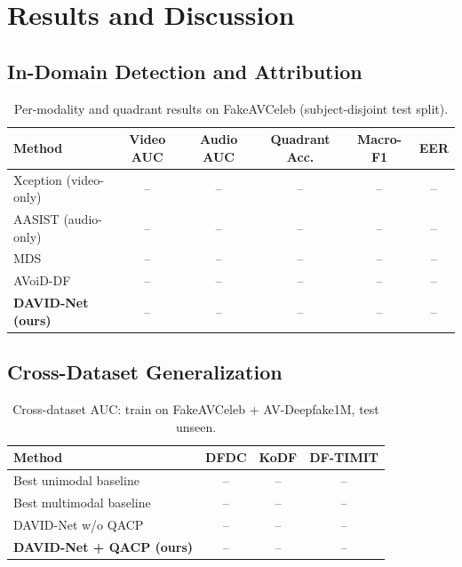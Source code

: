 \chapter{Results and Discussion}
\label{ch:results}


\section{In-Domain Detection and Attribution}
\begin{table}[h]
\centering
\caption{Per-modality and quadrant results on FakeAVCeleb (subject-disjoint test split). }
\label{tab:indomain}
\small
\begin{tabular}{lccccc}
\toprule
\textbf{Method} & \textbf{Video AUC} & \textbf{Audio AUC} & \textbf{Quadrant Acc.} & \textbf{Macro-F1} & \textbf{EER} \\
\midrule
Xception (video-only)     & -- & --   & -- & -- & -- \\
AASIST (audio-only)       & --   & -- & -- & -- & -- \\
MDS                       & -- & -- & -- & -- & -- \\
AVoiD-DF                  & -- & -- & -- & -- & -- \\
\textbf{DAVID-Net (ours)} & -- & -- & -- & -- & -- \\
\bottomrule
\end{tabular}
\end{table}

\section{Cross-Dataset Generalization}
\begin{table}[h]
\centering
\caption{Cross-dataset AUC: train on FakeAVCeleb + AV-Deepfake1M, test unseen. }
\label{tab:crossdataset}
\small
\begin{tabular}{lccc}
\toprule
\textbf{Method} & \textbf{DFDC} & \textbf{KoDF} & \textbf{DF-TIMIT} \\
\midrule
Best unimodal baseline    & -- & -- & -- \\
Best multimodal baseline  & -- & -- & -- \\
DAVID-Net w/o QACP        & -- & -- & -- \\
\textbf{DAVID-Net + QACP (ours)} & -- & -- & -- \\
\bottomrule
\end{tabular}
\end{table}

